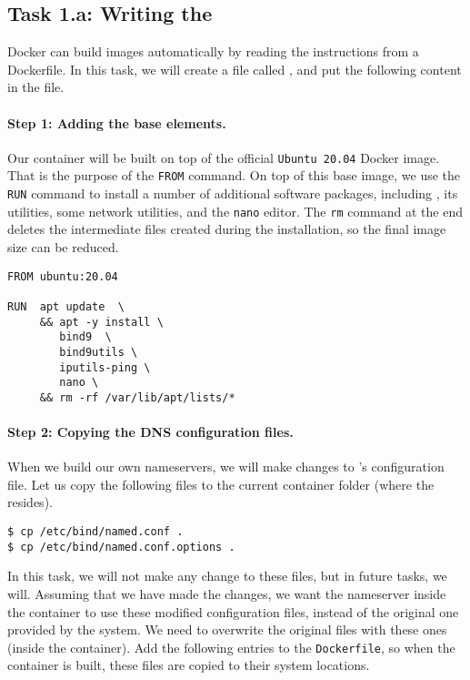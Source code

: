 \subsection{Task 1.a: Writing the \dockerfile}

Docker can build images automatically by reading the instructions from a Dockerfile. 
In this task, we will 
create a file called \dockerfile, and put the following 
content in the file. 

\paragraph{Step 1: Adding the base elements.} Our container 
will be built on top of the official \texttt{Ubuntu 20.04} Docker image. 
That is the purpose of the \texttt{FROM} command. 
On top of this base image, we use the \texttt{RUN} command
to install a number of additional software packages, including
\bind, its utilities, some network utilities, and the \texttt{nano}
editor.
The \texttt{rm} command at the end deletes the intermediate files
created during the installation, so the final image size can be reduced. 


\begin{lstlisting}
FROM ubuntu:20.04

RUN  apt update  \
     && apt -y install \
        bind9  \
        bind9utils \
        iputils-ping \
        nano \
     && rm -rf /var/lib/apt/lists/*
\end{lstlisting}



\paragraph{Step 2: Copying the DNS configuration files.} 
When we build our own nameservers, we will make changes
to \bind's configuration file. Let us copy
the following files to the current container folder (where 
the \dockerfile resides). 

\begin{lstlisting}
$ cp /etc/bind/named.conf .
$ cp /etc/bind/named.conf.options .
\end{lstlisting}


In this task, we will not make any change to these files, but 
in future tasks, we will. Assuming that we have made 
the changes, we want the nameserver inside the container
to use these modified configuration files, instead of the original
one provided by the system. We need to overwrite the 
original files with these ones (inside the container). Add 
the following entries to the \texttt{Dockerfile}, so when
the container is built, these files are copied to their 
system locations. 


